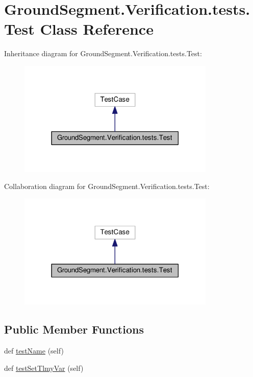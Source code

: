 \hypertarget{class_ground_segment_1_1_verification_1_1tests_1_1_test}{}\section{Ground\+Segment.\+Verification.\+tests.\+Test Class Reference}
\label{class_ground_segment_1_1_verification_1_1tests_1_1_test}


Inheritance diagram for Ground\+Segment.\+Verification.\+tests.\+Test\+:\nopagebreak
\begin{figure}[H]
\begin{center}
\leavevmode
\includegraphics[width=266pt]{class_ground_segment_1_1_verification_1_1tests_1_1_test__inherit__graph}
\end{center}
\end{figure}


Collaboration diagram for Ground\+Segment.\+Verification.\+tests.\+Test\+:\nopagebreak
\begin{figure}[H]
\begin{center}
\leavevmode
\includegraphics[width=266pt]{class_ground_segment_1_1_verification_1_1tests_1_1_test__coll__graph}
\end{center}
\end{figure}
\subsection*{Public Member Functions}
\begin{DoxyCompactItemize}
\item 
def \hyperlink{class_ground_segment_1_1_verification_1_1tests_1_1_test_a28cedaa8eaf2a6a2f613776db36c476d}{test\+Name} (self)
\item 
def \hyperlink{class_ground_segment_1_1_verification_1_1tests_1_1_test_afc4c680994da15988848c8c38e4f2aae}{test\+Set\+Tlmy\+Var} (self)
\end{DoxyCompactItemize}


